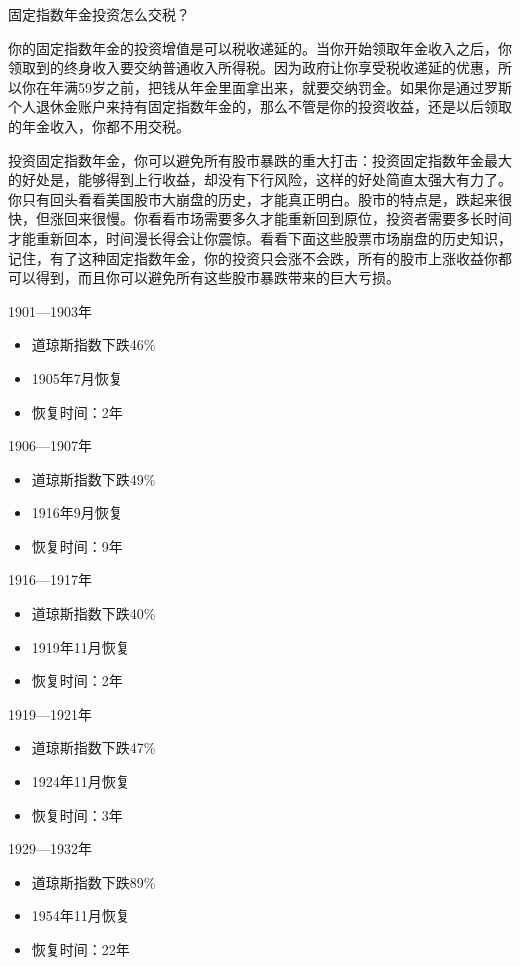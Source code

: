 固定指数年金投资怎么交税？

你的固定指数年金的投资增值是可以税收递延的。当你开始领取年金收入之后，你领取到的终身收入要交纳普通收入所得税。因为政府让你享受税收递延的优惠，所以你在年满59岁之前，把钱从年金里面拿出来，就要交纳罚金。如果你是通过罗斯个人退休金账户来持有固定指数年金的，那么不管是你的投资收益，还是以后领取的年金收入，你都不用交税。

投资固定指数年金，你可以避免所有股市暴跌的重大打击：投资固定指数年金最大的好处是，能够得到上行收益，却没有下行风险，这样的好处简直太强大有力了。你只有回头看看美国股市大崩盘的历史，才能真正明白。股市的特点是，跌起来很快，但涨回来很慢。你看看市场需要多久才能重新回到原位，投资者需要多长时间才能重新回本，时间漫长得会让你震惊。看看下面这些股票市场崩盘的历史知识，记住，有了这种固定指数年金，你的投资只会涨不会跌，所有的股市上涨收益你都可以得到，而且你可以避免所有这些股市暴跌带来的巨大亏损。

1901—1903年

\begin{itemize}
\item 道琼斯指数下跌46\%
\item 1905年7月恢复
\item 恢复时间：2年
\end{itemize}

1906—1907年

\begin{itemize}
\item 道琼斯指数下跌49\%
\item 1916年9月恢复
\item 恢复时间：9年
\end{itemize}

1916—1917年

\begin{itemize}
\item 道琼斯指数下跌40\%
\item 1919年11月恢复
\item 恢复时间：2年
\end{itemize}

1919—1921年

\begin{itemize}
\item 道琼斯指数下跌47\%
\item 1924年11月恢复
\item 恢复时间：3年
\end{itemize}

1929—1932年

\begin{itemize}
\item 道琼斯指数下跌89\%
\item 1954年11月恢复
\item 恢复时间：22年
\end{itemize}

